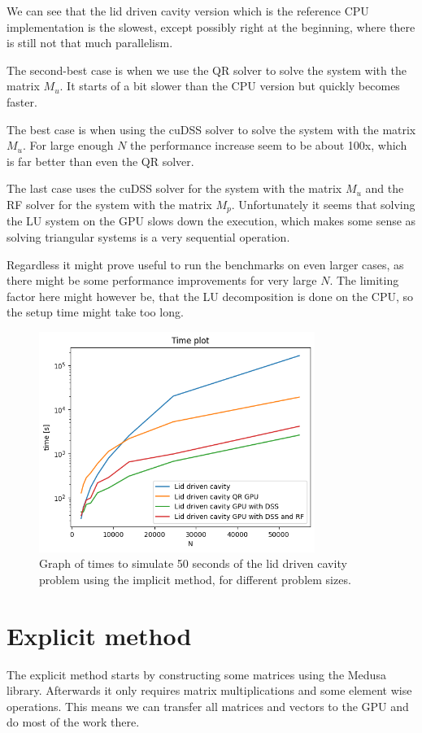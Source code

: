 \documentclass{article}
\begin{document}
We can see that the lid driven cavity version which is the reference CPU implementation 
is the slowest, except possibly right at the beginning, where there is still not that much 
parallelism. 

The second-best case is when we use the QR solver to solve the system with the matrix \(M_u\).
It starts of a bit slower than the CPU version but quickly becomes faster.

The best case is when using the cuDSS solver to solve the system with the matrix \(M_u\). For large 
enough \(N\) the performance increase seem to be about 100x, which is far better than even the QR 
solver.

The last case uses the cuDSS solver for the system with the matrix \(M_u\) and the 
RF solver for the system with the matrix \(M_p\). Unfortunately it seems that solving the  
LU system on the GPU slows down the execution, which makes some sense as solving triangular systems 
is a very sequential operation.

Regardless it might prove useful to run the benchmarks on even larger cases, as there might be some 
performance improvements for very large \(N\). The limiting factor here might however be, that 
the LU decomposition is done on the CPU, so the setup time might take too long.
\begin{figure}[h!] 
    \centering 
    \includegraphics[width=0.8\textwidth]{lidDriven_time.png} 
    \caption{Graph of times to simulate 50 seconds of the lid driven cavity problem using
    the implicit method, for different problem sizes.} 
    \label{fig:lidDriven_time} 
\end{figure}
\section{Explicit method}
The explicit method starts by constructing some matrices using the Medusa library. Afterwards it 
only requires matrix multiplications and some element wise operations. This means we can transfer
all matrices and vectors to the GPU and do most of the work there. 
\end{document}

